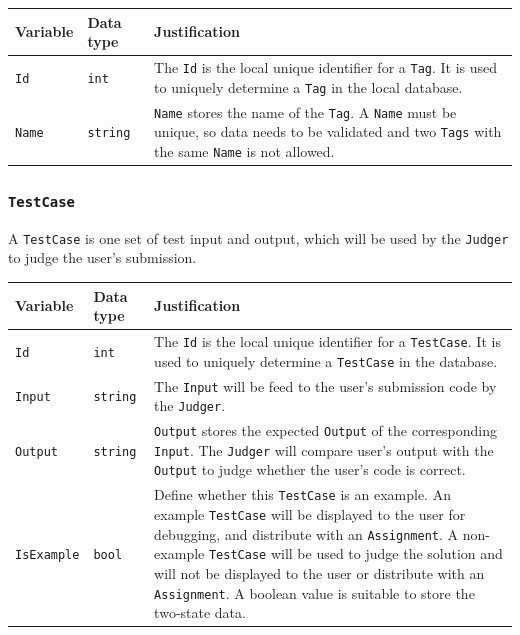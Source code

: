 \documentclass[a4paper]{report}
\begin{document}
\begin{tabulary}{\textwidth}{|l|l|L|}
    \hline
    Variable & Data type & Justification \\
    \hline
    \texttt{Id} & \texttt{int} & The \texttt{Id} is the local unique identifier for a \texttt{Tag}. It is used to uniquely determine a \texttt{Tag} in the local database. \\
    \hline
    \texttt{Name} & \texttt{string} & \texttt{Name} stores the name of the \texttt{Tag}. A \texttt{Name} must be unique, so data needs to be validated and two \texttt{Tags} with the same \texttt{Name} is not allowed. \\
    \hline
\end{tabulary}

\subsubsection{\texttt{TestCase}}

A \texttt{TestCase} is one set of test input and output, which will be used by the \texttt{Judger} to judge the user's submission.

\begin{tabulary}{\textwidth}{|l|l|L|}
    \hline
    Variable & Data type & Justification \\
    \hline
    \texttt{Id} & \texttt{int} & The \texttt{Id} is the local unique identifier for a \texttt{TestCase}. It is used to uniquely determine a \texttt{TestCase} in the database. \\
    \hline
    \texttt{Input} & \texttt{string} & The \texttt{Input} will be feed to the user's submission code by the \texttt{Judger}. \\
    \hline
    \texttt{Output} & \texttt{string} & \texttt{Output} stores the expected \texttt{Output} of the corresponding \texttt{Input}. The \texttt{Judger} will compare user's output with the \texttt{Output} to judge whether the user's code is correct. \\
    \hline
    \texttt{IsExample} & \texttt{bool} & Define whether this \texttt{TestCase} is an example. An example \texttt{TestCase} will be displayed to the user for debugging, and distribute with an \texttt{Assignment}. A non-example \texttt{TestCase} will be used to judge the solution and will not be displayed to the user or distribute with an \texttt{Assignment}. A boolean value is suitable to store the two-state data. \\
    \hline
\end{tabulary}
\end{document}
